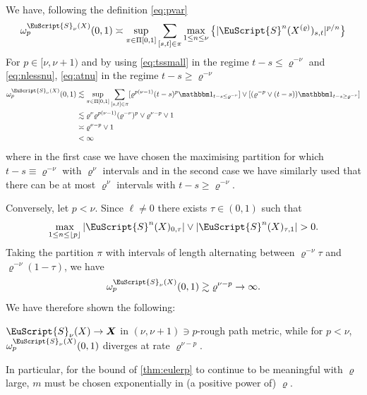 \documentclass{article}
\newcommand{\bX}{\boldsymbol{X}}
\def\Sig{\EuScript{S}}
\def\p{{\lfloor p \rfloor}}
\numberwithin{equation}{section}
\theoremstyle{definition}
\theoremstyle{remark}
\begin{document}
We have, following the definition \eqref{eq:pvar}
\begin{align*}
\omega_p^{\Sig_\nu(X)}(0,1) \asymp \sup_{\pi \in \Pi[0,1]} \sum_{[s,t] \in \pi} \max_{1 \leq n \leq \nu} \big\{ |\Sig^n(X^{(\varrho)})_{s,t}|^{p/n} \big\}
\end{align*}
For $p \in [\nu, \nu + 1)$ and by using \eqref{eq:tssmall} in the regime $t-s \leq \varrho^{-\nu}$ and \eqref{eq:nlessnu}, \eqref{eq:atnu} in the regime $t-s \geq \varrho^{-\nu}$
\begin{align*}
\omega_p^{\Sig_\nu(X)}(0,1) &\lesssim \sup_{\pi \in \Pi[0,1]} \sum_{[s,t] \in \pi} [\varrho^{p(\nu - 1)}(t-s)^p \mathbbm 1_{t-s \leq \varrho^{-\nu}}] \vee [(\varrho^{-p}  \vee (t-s) )\mathbbm 1_{t-s \geq \varrho^{-\nu}}] \\
&\lesssim \varrho^\nu \varrho^{p(\nu - 1)} (\varrho^{-\nu})^p \vee \varrho^{\nu - p} \vee 1 \\
&\asymp \varrho^{\nu - p} \vee 1 \\
&< \infty
\end{align*}
where in the first case we have chosen the maximising partition for which $t - s \equiv \varrho^{-\nu}$ with $\varrho^\nu$ intervals and in the second case we have similarly used that there can be at most $\varrho^\nu$ intervals with $t-s \geq \varrho^{-\nu}$. 

Conversely, let $p < \nu$. Since $\ell \neq 0$ there exists $\tau \in (0,1)$ such that 
\[
\max_{1 \leq n \leq \p} |\Sig^n(X)_{0,\tau}| \vee |\Sig^n(X)_{\tau,1}| > 0.
\]
Taking the partition $\pi$ with intervals of length alternating between $\varrho^{-\nu}\tau$ and $\varrho^{-\nu}(1 - \tau)$, we have
\[
\omega_p^{\Sig_\nu(X)}(0,1) \gtrsim \varrho^{\nu-p} \to \infty.
\]
We have therefore shown the following:
\begin{proposition}
$\Sig_\nu(X) \to \bX$ in $(\nu, \nu + 1) \ni p$-rough path metric, while for $p < \nu$, $\omega_p^{\Sig_\nu(X)}(0,1)$ diverges at rate $\varrho^{\nu - p}$.
\end{proposition}
In particular, for the bound of \autoref{thm:eulerp} to continue to be meaningful with $\varrho$ large, $m$ must be chosen exponentially in (a positive power of) $\varrho$.
\end{document}
